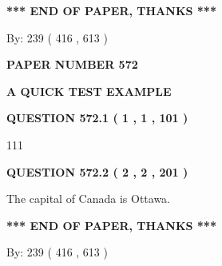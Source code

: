 \documentclass[12pt]{article}
\begin{document}
\vspace{1.0in} 
{\textbf{\large{ *** END OF PAPER, THANKS *** }}} 
   
   
\hspace{1.0in} By: 
 239 ( 416 ,  613 )
   
   
   
   
\newpage 
\setcounter{page}{ 
   572001 } 
   
   
   
   
 {\textbf{ \Large{ PAPER NUMBER  572  }}}
   
   
\vspace{0.2in}
   
   
   
   
   
   
 \vspace{0.2in}
{\LARGE {\textbf{ A QUICK TEST EXAMPLE}}}
   
   
  
\vspace{0.2in}
  
{\textbf{\Large{QUESTION
572.1 
 ( 1 , 1 , 101 )
}}}
  
  
 
 
\noindent{}

111
 
 
  
\vspace{0.2in}
  
{\textbf{\Large{QUESTION
572.2 
 ( 2 , 2 , 201 )
}}}
  
  
 
 
\noindent{}
 
 
The capital of Canada is Ottawa.
 
 
 
 
   
   
 \vspace{0.2in}
 
   
   
   
   
\vspace{1.0in} 
{\textbf{\large{ *** END OF PAPER, THANKS *** }}} 
   
   
\hspace{1.0in} By: 
 239 ( 416 ,  613 )
   
\end{document}
